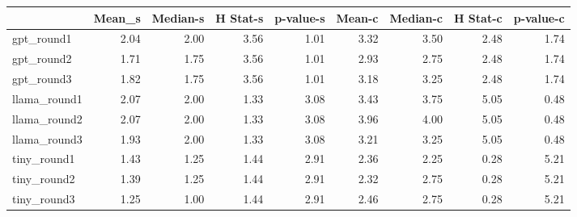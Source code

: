 \begin{tabular}{lrrrrrrrr}
\toprule
 & Mean_s & Median-s & H Stat-s & p-value-s & Mean-c & Median-c & H Stat-c & p-value-c \\
\midrule
gpt_round1 & 2.04 & 2.00 & 3.56 & 1.01 & 3.32 & 3.50 & 2.48 & 1.74 \\
gpt_round2 & 1.71 & 1.75 & 3.56 & 1.01 & 2.93 & 2.75 & 2.48 & 1.74 \\
gpt_round3 & 1.82 & 1.75 & 3.56 & 1.01 & 3.18 & 3.25 & 2.48 & 1.74 \\
llama_round1 & 2.07 & 2.00 & 1.33 & 3.08 & 3.43 & 3.75 & 5.05 & 0.48 \\
llama_round2 & 2.07 & 2.00 & 1.33 & 3.08 & 3.96 & 4.00 & 5.05 & 0.48 \\
llama_round3 & 1.93 & 2.00 & 1.33 & 3.08 & 3.21 & 3.25 & 5.05 & 0.48 \\
tiny_round1 & 1.43 & 1.25 & 1.44 & 2.91 & 2.36 & 2.25 & 0.28 & 5.21 \\
tiny_round2 & 1.39 & 1.25 & 1.44 & 2.91 & 2.32 & 2.75 & 0.28 & 5.21 \\
tiny_round3 & 1.25 & 1.00 & 1.44 & 2.91 & 2.46 & 2.75 & 0.28 & 5.21 \\
\bottomrule
\end{tabular}
